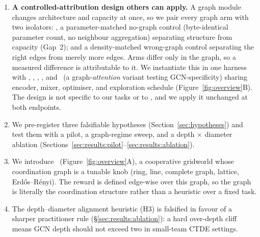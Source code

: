 \begin{enumerate}[leftmargin=*,itemsep=0pt,topsep=2pt]
        \gnnqmix\ is bested by \qmix\ in
        both mean return and seed-level variance, even on an
        edge-defined-reward task whose observations (under the non-ego obs
        mode used there) already expose neighbour displacements, so message
        passing is at best redundant; the non-trivial finding is the
        capacity-matched \emph{identification} of the cause
        (\S\ref{sec:results:capacity}: the no-graph \mlpqmix\ matches \qmix\
        while \gnnqmix\ falls far below both). The unstabilised-graph deficit
        survives a
        $5\times$ longer training budget at $n{=}\PEseeds$ seeds, grows
        monotonically with team size out to $N{=}16$ (distinct from the
        positive structure effect of contribution~1, which is significant at
        every $N$ but non-monotone), reappears under the capacity
        decomposition on MPE \texttt{simple\_spread} (where the naive
        \gnnqmix-vs-\qmix\ comparison is null; \S\ref{sec:results:mpe}), and
        persists under graph attention---but stabilising the GCN recovers it
        to parity with the controls (Appendix~\ref{app:repaired}), so what
        survives for the stabilised operator is the weaker, robust
        \emph{no-benefit} claim.
  \item \textbf{A controlled-attribution design others can apply.} A graph
        module changes architecture and capacity at once, so we pair every
        graph arm with two isolators: \mlpqmix, a parameter-matched no-graph
        control (byte-identical parameter count, no neighbour aggregation)
        separating structure from capacity (Gap~2); and a density-matched
        wrong-graph control separating the right edges from merely more
        edges. Arms differ only in the graph, so a measured difference is
        attributable to it. We instantiate this in one harness with \iql,
        \vdn, \qmix, \gnnqmix, and \gatqmix\ (a graph-\emph{attention} variant
        testing GCN-specificity) sharing encoder, mixer, optimiser, and
        exploration schedule (Figure~\ref{fig:overview}B). The design is not
        specific to our tasks or to \qmix, and we apply it unchanged at both
        endpoints.
  \item We pre-register three falsifiable hypotheses
        (Section~\ref{sec:hypotheses}) and test them with a pilot,
        a graph-regime sweep, and a depth $\times$ diameter ablation
        (Sections~\ref{sec:results:pilot}--\ref{sec:results:ablation}).
  \item We introduce \coordgrid\ (Figure~\ref{fig:overview}A), a cooperative
        gridworld whose coordination graph is a tunable knob (ring, line,
        complete graph, lattice, Erd\H{o}s--R\'enyi). The reward is defined
        edge-wise over this graph, so the graph is literally the
        coordination structure rather than a heuristic over a fixed task.
  \item The depth--diameter alignment heuristic (H3) is falsified in favour
        of a sharper practitioner rule (\S\ref{sec:results:ablation}): a
        hard over-depth cliff means GCN depth should not exceed two in
        small-team CTDE settings.
\end{enumerate}

